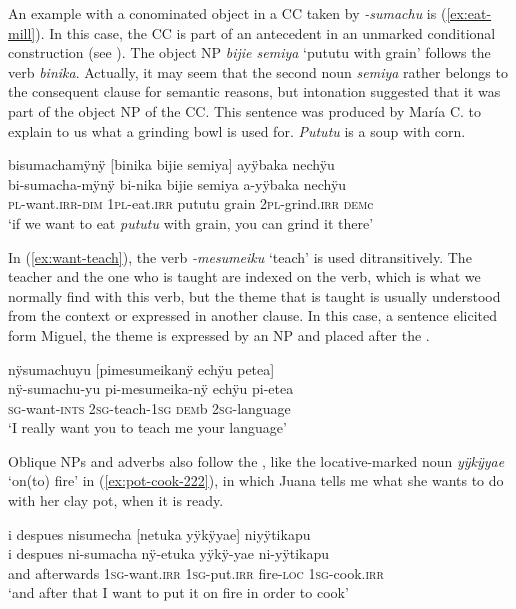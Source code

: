 An example with a conominated object in a CC taken by \textit{-sumachu} is (\ref{ex:eat-mill}). In this case, the CC is part of an antecedent in an unmarked conditional construction (see ). The object NP \textit{bijie semiya} ‘pututu with grain’ follows the verb \textit{binika}. Actually, it may seem that the second noun \textit{semiya} rather belongs to the consequent clause for semantic reasons, but intonation suggested that it was part of the object NP of the CC. This sentence was produced by María C. to explain to us what a grinding bowl is used for. \textit{Pututu} is a soup with corn.

\ea\label{ex:eat-mill}
\begingl
\glpreamble bisumachamÿnÿ \textup{[}binika bijie semiya\textup{]} ayÿbaka nechÿu\\
\gla bi-sumacha-mÿnÿ bi-nika bijie semiya a-yÿbaka nechÿu\\
\textsc{pl}-want.\textsc{irr}-\textsc{dim} 1\textsc{pl}-eat.\textsc{irr} pututu grain 2\textsc{pl}-grind.\textsc{irr} \textsc{dem}c\\
\glft ‘if we want to eat \textit{pututu} with grain, you can grind it there’
\endgl
\trailingcitation{[cux-c120414ls-2.217]}
\xe


In (\ref{ex:want-teach}), the verb \textit{-mesumeiku} ‘teach’ is used ditransitively. The teacher and the one who is taught are indexed on the verb, which is what we normally find with this verb, but the theme that is taught is usually understood from the context or expressed in another clause. In this case, a sentence elicited form Miguel, the theme is expressed by an NP and placed after the .

\ea\label{ex:want-teach}
\begingl
\glpreamble nÿsumachuyu \textup{[}pimesumeikanÿ echÿu petea\textup{]} \\
\gla nÿ-sumachu-yu pi-mesumeika-nÿ echÿu pi-etea \\
\textsc{sg}-want-\textsc{ints} 2\textsc{sg}-teach-1\textsc{sg} \textsc{dem}b 2\textsc{sg}-language\\
\glft ‘I really want you to teach me your language’
\endgl
\trailingcitation{[mxx-e090728s-3.055]}
\xe

Oblique NPs and adverbs also follow the , like the locative-marked noun \textit{yÿkÿyae} ‘on(to) fire’ in (\ref{ex:pot-cook-222}), in which Juana tells me what she wants to do with her clay pot, when it is ready.

\ea\label{ex:pot-cook-222}
\begingl
\glpreamble i despues nisumecha \textup{[}netuka yÿkÿyae\textup{]} niyÿtikapu\\
\gla i despues ni-sumacha nÿ-etuka yÿkÿ-yae ni-yÿtikapu\\
\glb and afterwards 1\textsc{sg}-want.\textsc{irr} 1\textsc{sg}-put.\textsc{irr} fire-\textsc{loc} 1\textsc{sg}-cook.\textsc{irr}\\
\glft ‘and after that I want to put it on fire in order to cook’
\endgl
\trailingcitation{[jxx-d110923l-4.14]}
\xe


